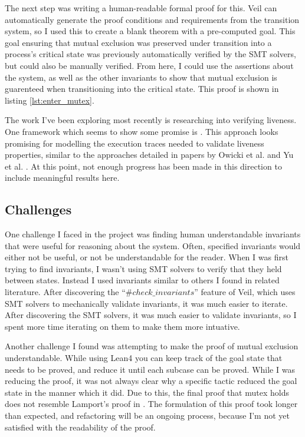 \documentclass{article}
\theoremstyle{definition}
\begin{document}
        The next step was writing a human-readable formal proof for this.
        Veil can automatically generate the proof conditions and requirements from the transition system,
        so I used this to create a blank theorem with a pre-computed goal.
        This goal ensuring that mutual exclusion was preserved under transition into a process's critical state was previously 
        automatically verified by the SMT solvers, but could also be manually verified. 
        From here, I could use the assertions about the system, as well as the other invariants to show that 
        mutual exclusion is guarenteed when transitioning into the critical state.
        This proof is shown in listing \ref{lst:enter_mutex}.

        The work I've been exploring most recently is researching into verifying liveness.
        One framework which seems to show some promise is \cite{vinLeanLTLUnifyingFramework2025}.
        This approach looks promising for modelling the execution traces needed to validate liveness properties, 
        similar to the approaches detailed in papers by Owicki et al. \cite{owickiProvingLivenessProperties1982} and Yu et al. \cite{yuFormalVerificationMutex2012}.
        At this point, not enough progress has been made in this direction to include meaningful results here.

    \subsection{Challenges}
        One challenge I faced in the project was finding human understandable invariants that were useful for reasoning about 
        the system.
        Often, specified invariants would either not be useful, or not be understandable for the reader.
        When I was first trying to find invariants, I wasn't using SMT solvers to verify that they held between states.
        Instead I used invariants similar to others I found in related literature. 
        After discovering the ``$\#check\_invariants$'' feature of Veil, which uses SMT solvers to mechanically validate invariants,
        it was much easier to iterate. 
        After discovering the SMT solvers, it was much easier to validate invariants, so I spent more time
        iterating on them to make them more intuative.

        Another challenge I found was attempting to make the proof of mutual exclusion understandable.
        While using Lean4 you can keep track of the goal state that needs to be proved, 
        and reduce it until each subcase can be proved. 
        While I was reducing the proof, it was not always clear why a specific tactic reduced the goal state in the manner which it did.
        Due to this, the final proof that mutex holds does not resemble Lamport's proof in \cite{lamport_mutual_1986}.
        The formulation of this proof took longer than expected, and refactoring will be an ongoing process,  
        because I'm not yet satisfied with the readability of the proof.
\end{document}

